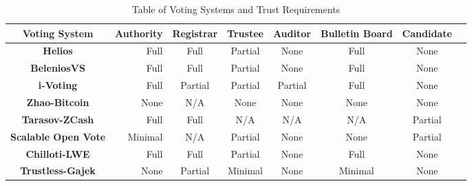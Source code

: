 \begin{table}[H]
    \centering
    \begin{tabular}{|Sr c c c c c c |}
        \hline
        Voting System               & Authority & Registrar & Trustee & Auditor & Bulletin Board & Candidate \\
        \hline\hline
        \textbf{Helios}             & Full      & Full      & Partial & None    & Full           & None      \\
        \hline
        \textbf{BeleniosVS}         & Full      & Full      & Partial & None    & Full           & None      \\
        \hline
        \textbf{i-Voting}           & Full      & Partial   & Partial & Partial & Full           & None      \\
        \hline
        \textbf{Zhao-Bitcoin}       & None      & N/A       & None    & None    & None           & None      \\
        \hline
        \textbf{Tarasov-ZCash}      & Full      & Full      & N/A     & N/A     & N/A            & Partial   \\
        \hline
        \textbf{Scalable Open Vote} & Minimal   & N/A       & Partial & None    & None           & Partial   \\
        \hline
        \textbf{Chilloti-LWE}       & Full      & Full      & Partial & None    & Full           & None      \\
        \hline
        \textbf{Trustless-Gajek}    & None      & Partial   & Minimal & None    & Minimal        & None      \\
        \hline
    \end{tabular}

    \caption{Table of Voting Systems and Trust Requirements}
    \label{table:voting-system-props}
\end{table}%





